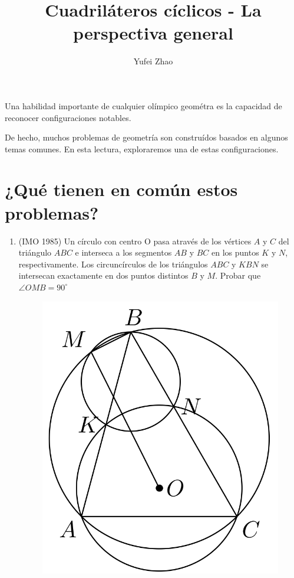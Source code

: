 \documentclass[11pt, a4paper]{article}
\title{\bf{Cuadril\'ateros c\'iclicos - La perspectiva general}}
\author{Yufei Zhao}
\date{}
\begin{document}
	\maketitle
	Una habilidad importante de cualquier ol\'impico geom\'etra es la capacidad de reconocer configuraciones notables.
	
	De hecho, muchos problemas de geometr\'ia son constru\'idos basados en algunos temas comunes. En esta lectura, exploraremos una de estas configuraciones.
	\section{¿Qu\'e tienen en com\'un estos problemas?}
	\begin{enumerate}
	\item (IMO 1985) Un c\'irculo con centro O pasa atrav\'es de los v\'ertices $A$ y $C$ del tri\'angulo $ABC$ e interseca a los segmentos $AB$ y $BC$ en los puntos $K$ y $N$, respectivamente. Los circunc\'irculos de los tri\'angulos $ABC$ y $KBN$ se intersecan exactamente en dos puntos distintos $B$ y $M$. Probar que $\angle OMB = 90^{\circ}$
	\begin{figure}[h]
		\centering
		\includegraphics[scale=0.18]{p1.1x}

\end{figure}
\end{enumerate}
\end{document}
